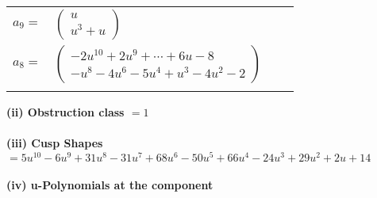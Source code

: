 \documentclass[1p]{elsarticle_modified}
\theoremstyle{definition}
\begin{document}
\begin{tabular}{m{7pt} m{180pt} m{7pt} m{180pt} }
\flushright $a_{9}=$&$\begin{pmatrix}u\\u^3+u\end{pmatrix}$ \\
\flushright $a_{8}=$&$\begin{pmatrix}-2 u^{10}+2 u^9+\cdots+6 u-8\\- u^8-4 u^6-5 u^4+u^3-4 u^2-2\end{pmatrix}$\\&\end{tabular}
\flushleft \textbf{(ii) Obstruction class $= 1$}\\~\\
\flushleft \textbf{(iii) Cusp Shapes $= 5 u^{10}-6 u^9+31 u^8-31 u^7+68 u^6-50 u^5+66 u^4-24 u^3+29 u^2+2 u+14$}\\~\\
\newpage\renewcommand{\arraystretch}{1}
\flushleft \textbf{(iv) u-Polynomials at the component}\newline \\
\end{document}
